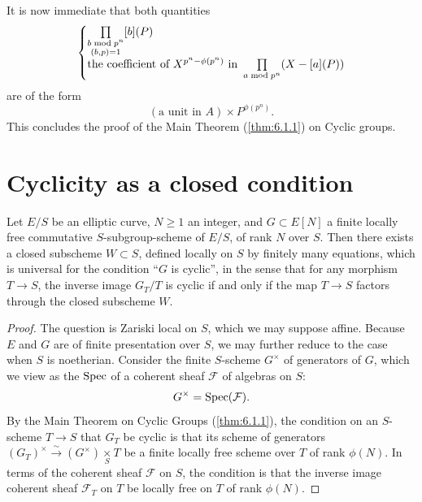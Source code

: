 It is now immediate that both quantities
\[
\left\{ \begin{array}{@{}l@{}}
\prod\limits_{\substack{b \bmod p^n \\ (b,p)=1}} [b](P) \\[6pt]
\text{the coefficient of } X^{p^n-\phi(p^n)} \text{ in } \prod\limits_{a \bmod p^n} (X - [a](P))
\end{array} \right.
\]
are of the form
\[
(\text{a unit in } A) \times P^{\phi(p^n)}.
\]
This concludes the proof of the Main Theorem (\ref{thm:6.1.1}) on Cyclic groups.

\section{Cyclicity as a closed condition}
\label{sec:6.4}

\begin{kthm}\label{thm:6.4.1}
Let $E/S$ be an elliptic curve, $N \ge 1$ an integer, and $G \subset E[N]$ a finite locally free commutative $S$-subgroup-scheme of $E/S$, of rank $N$ over $S$. Then there exists a closed subscheme $W \subset S$, defined locally on $S$ by finitely many equations, which is universal for the condition ``$G$ is cyclic'', in the sense that for any morphism $T \to S$, the inverse image $G_T/T$ is cyclic if and only if the map $T \to S$ factors through the closed subscheme $W$.
\end{kthm}

\begin{proof}
The question is Zariski local on $S$, which we may suppose affine. Because $E$ and $G$ are of finite presentation over $S$, we may further reduce to the case when $S$ is noetherian. Consider the finite $S$-scheme $G^\times$ of generators of $G$, which we view as the $\operatorname{Spec}$ of a coherent sheaf $\mathcal{F}$ of algebras on $S$:
\[
G^\times = \operatorname{Spec}(\mathcal{F}).
\]
By the Main Theorem on Cyclic Groups (\ref{thm:6.1.1}), the condition on an $S$-scheme $T \to S$ that $G_T$ be cyclic is that its scheme of generators $(G_T)^\times \xrightarrow{\ \sim\ } (G^\times) \underset{S}{\times} T$ be a finite locally free scheme over $T$ of rank $\phi(N)$. In terms of the coherent sheaf $\mathcal{F}$ on $S$, the condition is that the inverse image coherent sheaf $\mathcal{F}_T$ on $T$ be locally free on $T$ of rank $\phi(N)$.
\end{proof}

